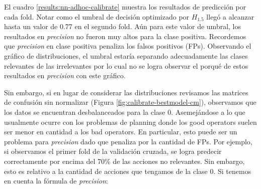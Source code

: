 \begin{table}[h!]
    \centering
     \caption{Métricas sobre el conjunto de test del modelo NN ad-hoc.}
     \label{results:nn-adhoc-calibrate}
\end{table}

El cuadro \ref{results:nn-adhoc-calibrate} muestra los resultados de predicción
por cada fold. Notar como el umbral de decisión optimizado por $H_{1.5}$ llegó a
alcanzar hasta un valor de 0.77 en el segundo fold. Aún para este valor de
umbral, los resultados en \emph{precision} no fueron muy altos para la clase
positiva. Recordemos que \emph{precision} en clase positiva penaliza los falsos
positivos (FPs). Observando el gráfico de distribuciones, el umbral estaría
separando adecuadamente las clases relevantes de las irrelevantes por lo cual no
se logra observar el porqué de estos resultados en \emph{precision} con este
gráfico.

Sin embargo, si en lugar de considerar las distribuciones revisamos las matrices
de confusión sin normalizar (Figura \ref{fig:calibrate-bestmodel-cm}),
observamos que los datos se encuentran desbalanceados para la clase 0.
Asemejándose a lo que usualmente ocurre con los problemas de planning donde los
good operators suelen ser menor en cantidad a los bad operators. En particular,
esto puede ser un problema para \emph{precision} dado que penaliza por la
cantidad de FPs. Por ejemplo, si observamos el primer fold de la validación
cruzada, se logra predecir correctamente por encima del 70\% de las acciones no
relevantes. Sin embargo, esto es relativo a la cantidad de acciones que tengamos
de la clase 0. Si tenemos en cuenta la fórmula de \emph{precision}:


